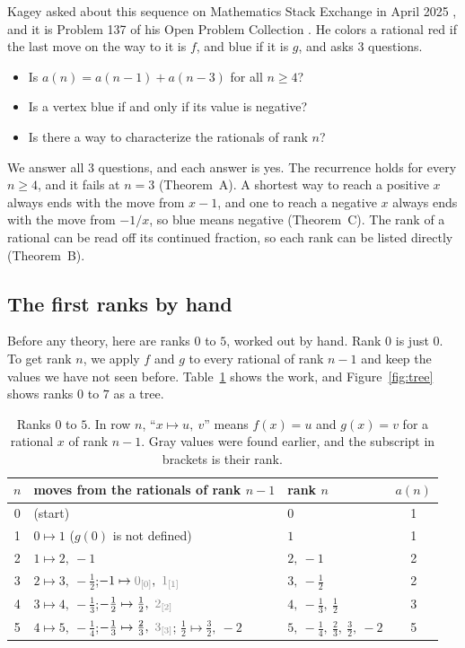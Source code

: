 \documentclass[11pt]{article}
\theoremstyle{definition}
\theoremstyle{remark}
\newcommand{\old}[2]{\textcolor{black!50}{#1}_{\textcolor{black!50}{[#2]}}} %
\begin{document}
Kagey asked about this sequence on Mathematics Stack Exchange in April 2025 \cite{kagey-mse}, and
it is Problem 137 of his Open Problem Collection \cite{kagey137}. He colors a rational
\textcolor{fred}{red} if the last move on the way to it is $f$, and \textcolor{gblue}{blue} if it
is $g$, and asks 3 questions.
\begin{itemize}[leftmargin=2.2em]
\item[\textbf{Q1.}] Is $a(n)=a(n-1)+a(n-3)$ for all $n\ge4$?
\item[\textbf{Q2.}] Is a vertex blue if and only if its value is negative?
\item[\textbf{Q3.}] Is there a way to characterize the rationals of rank $n$?
\end{itemize}
We answer all 3 questions, and each answer is yes. The recurrence holds for every $n\ge4$, and it
fails at $n=3$ (Theorem~A). A shortest way to reach a positive $x$ always ends with the move from
$x-1$, and one to reach a negative $x$ always ends with the move from $-1/x$, so blue means
negative (Theorem~C). The rank of a rational can be read off its continued fraction, so each rank
can be listed directly (Theorem~B).

\subsection{The first ranks by hand}\label{sec:hand}

Before any theory, here are ranks $0$ to $5$, worked out by hand. Rank $0$ is just $0$. To get
rank $n$, we apply $f$ and $g$ to every rational of rank $n-1$ and keep the values we have not
seen before. Table~\ref{tab:hand} shows the work, and Figure~\ref{fig:tree} shows ranks $0$ to $7$
as a tree.

\begin{table}[ht]
\centering\small
\renewcommand{\arraystretch}{1.2}
\begin{tabular}{@{}c l l c@{}}
\toprule
$n$ & moves from the rationals of rank $n-1$ & rank $n$ & $a(n)$\\
\midrule
0 & (start) & $0$ & 1\\
1 & $0\mapsto 1$ \quad ($g(0)$ is not defined) & $1$ & 1\\
2 & $1\mapsto 2,\ -1$ & $2,\ -1$ & 2\\
3 & $2\mapsto 3,\ -\tfrac12$;\quad $-1\mapsto \old{0}{0},\ \old{1}{1}$ & $3,\ -\tfrac12$ & 2\\
4 & $3\mapsto 4,\ -\tfrac13$;\quad $-\tfrac12\mapsto \tfrac12,\ \old{2}{2}$ &
  $4,\ -\tfrac13,\ \tfrac12$ & 3\\
5 & $4\mapsto 5,\ -\tfrac14$;\quad $-\tfrac13\mapsto\tfrac23,\ \old{3}{3}$;\quad
  $\tfrac12\mapsto\tfrac32,\ -2$ & $5,\ -\tfrac14,\ \tfrac23,\ \tfrac32,\ -2$ & 5\\
\bottomrule
\end{tabular}
\caption{Ranks $0$ to $5$. In row $n$, ``$x\mapsto u,\ v$'' means $f(x)=u$ and $g(x)=v$ for a
rational $x$ of rank $n-1$. Gray values were found earlier, and the subscript in brackets is their
rank.}
\label{tab:hand}
\end{table}
\end{document}
